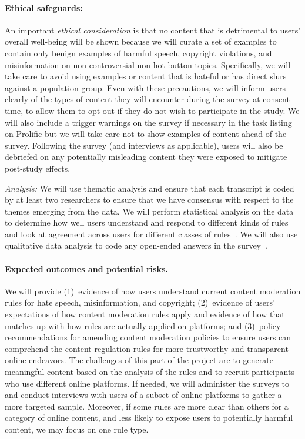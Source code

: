 \paragraph{Ethical safeguards:} An important \textit{ethical consideration} is
that no content that is detrimental to users' overall well-being will be shown
because we will curate a set of examples to contain only benign examples of
harmful speech, copyright violations, and misinformation on
non-controversial non-hot button topics.  Specifically, we will take care to
avoid using examples or content that is hateful or has direct slurs against a
population group. Even with these precautions, we will inform users clearly of
the types of content they will encounter during the survey at consent time, to
allow them to opt out if they do not wish to participate in the study. We will
also include a trigger warnings on the survey if necessary in the task listing
on Prolific but we will take care not to show examples of content ahead of the
survey. Following the survey (and interviews as applicable), users will also
be debriefed on any potentially misleading content they were exposed to
mitigate post-study effects.


\textit{Analysis:} We will use thematic analysis and ensure that each
transcript is coded by at least two researchers to ensure that we have
consensus with respect to the themes emerging from the data.  We will perform
statistical analysis on the data to determine how well users understand and
respond to different kinds of rules and look at agreement across users for
different classes of rules~\cite{lazar2017research}. We will also use
qualitative data analysis to code any open-ended answers in the
survey~\cite{saldana_coding_2013}. 


\paragraph{Expected outcomes and potential risks.} We will provide
(1)~evidence of how users
understand current content moderation rules for hate speech, misinformation,
and copyright; (2)~evidence of users' expectations of how content moderation
rules apply and evidence of how that matches up with how rules are actually
applied on platforms; and (3)~policy recommendations for amending content
moderation policies to ensure users can comprehend the content regulation
rules for more trustworthy and transparent online endeavors. The challenges of
this part of the project are to generate meaningful content based on the
analysis of the rules and to recruit participants who use different online platforms.
If needed, we will administer the surveys to and conduct interviews with users of a subset of online
platforms to gather a more targeted sample. Moreover, if some rules are more clear
than others for a category of online content, and less likely to expose users to potentially harmful content,
we may focus on one rule type.  


